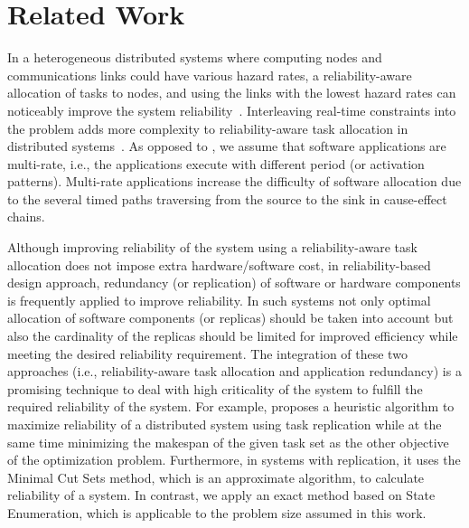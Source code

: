 \section{Related Work}\label{sec_RW}

In a heterogeneous distributed systems where computing nodes and communications links could have various hazard rates, a reliability-aware allocation of tasks to nodes, and using the links with the lowest hazard rates can noticeably improve the system reliability~\cite{shatz1992task}\cite{kartik1997task}\cite{yin2007task}\cite{zhang2015maximizing}. 
Interleaving real-time constraints into the problem adds more complexity to reliability-aware task allocation in distributed systems~\cite{faragardi2013optimal}. As opposed to \cite{Wozniak2013AnArchitectures}\cite{Saidi2015AnArchitectures}, we assume that software applications are multi-rate, i.e., the applications execute with different period (or activation patterns). Multi-rate applications increase the difficulty of software allocation due to the several timed paths traversing from the source to the sink in cause-effect chains.

Although improving reliability of the system using a reliability-aware task allocation does not impose extra hardware/software cost,  in reliability-based design approach, redundancy (or replication) of software or hardware components is frequently applied to improve reliability. In such systems not only optimal allocation of software components (or replicas) should be taken into account but also the cardinality of the replicas should be limited for improved efficiency while meeting the desired reliability requirement. The integration of these two approaches (i.e., reliability-aware task allocation and application redundancy) is a promising technique to deal with high criticality of the system to fulfill the required reliability of the system. For example, \cite{assayad2004bi} proposes a heuristic algorithm to maximize reliability of a distributed system using task replication while at the same time minimizing the makespan of the given task set as the other objective of the optimization problem. Furthermore, in systems with replication, it uses the Minimal Cut Sets method, which is an approximate algorithm, to calculate reliability of a system. In contrast, we apply an exact method based on State Enumeration, which is applicable to the problem size assumed in this work.

